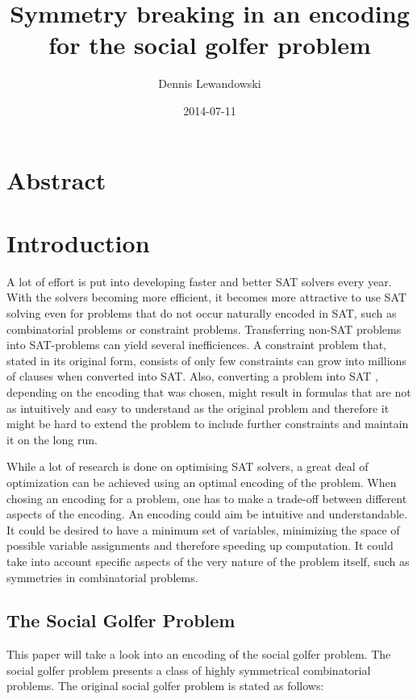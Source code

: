 \documentclass[a4paper]{scrartcl}
\title{Symmetry breaking in an encoding for the social golfer problem}
\author{Dennis Lewandowski}
\date{2014-07-11}
\begin{document}
\maketitle

\section{Abstract}

\section{Introduction}

A lot of effort is put into developing faster and better SAT solvers every year. With the solvers becoming more efficient, it becomes more attractive to use SAT solving even for problems that do not occur naturally encoded in SAT, such as combinatorial problems or constraint problems. Transferring non-SAT problems into SAT-problems can yield several inefficiences. A constraint problem that, stated in its original form, consists of only few constraints can grow into millions of clauses when converted into SAT. Also, converting a problem into SAT , depending on the encoding that was chosen, might result in formulas that are not as intuitively and easy to understand as the original problem and therefore it might be hard to extend the problem to include further constraints and maintain it on the long run.

While a lot of research is done on optimising SAT solvers, a great deal of optimization can be achieved using an optimal encoding of the problem. When chosing an encoding for a problem, one has to make a trade-off between different aspects of the encoding. An encoding could aim be intuitive and understandable. It could be desired to have a minimum set of variables, minimizing the space of possible variable assignments and therefore speeding up computation. It could take into account specific aspects of the very nature of the problem itself, such as symmetries in combinatorial problems.

\subsection{The Social Golfer Problem}

This paper will take a look into an encoding of the social golfer problem. The social golfer problem presents a class of highly symmetrical combinatorial problems. The original social golfer problem is stated as follows:
\end{document}
